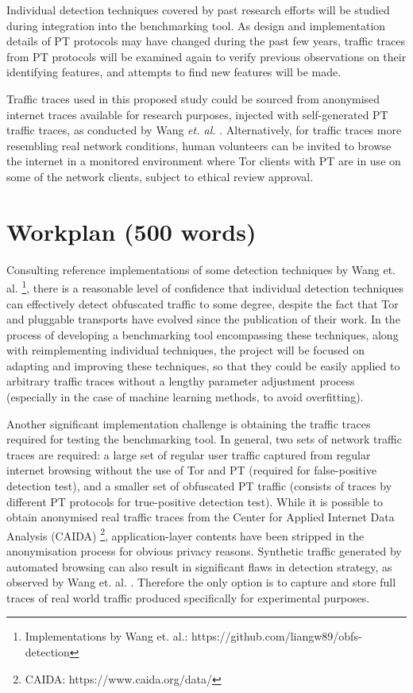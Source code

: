 \documentclass[11pt]{article}
\begin{document}
Individual detection techniques covered by past research efforts will be studied during integration into the benchmarking tool. As design and implementation details of PT protocols may have changed during the past few years, traffic traces from PT protocols will be examined again to verify previous observations on their identifying features, and attempts to find new features will be made.

Traffic traces used in this proposed study could be sourced from anonymised internet traces available for research purposes, injected with self-generated PT traffic traces, as conducted by Wang \emph{et. al.} \cite[Sec. 3]{wang2015seeing}. Alternatively, for traffic traces more resembling real network conditions, human volunteers can be invited to browse the internet in a monitored environment where Tor clients with PT are in use on some of the network clients, subject to ethical review approval.


\section{Workplan (500 words)}

Consulting reference implementations of some detection techniques by Wang et. al. \cite{wang2015seeing} \footnote{Implementations by Wang et. al.: https://github.com/liangw89/obfs-detection}, there is a reasonable level of confidence that individual detection techniques can effectively detect obfuscated traffic to some degree, despite the fact that Tor and pluggable transports have evolved since the publication of their work. In the process of developing a benchmarking tool encompassing these techniques, along with reimplementing individual techniques, the project will be focused on adapting and improving these techniques, so that they could be easily applied to arbitrary traffic traces without a lengthy parameter adjustment process (especially in the case of machine learning methods, to avoid overfitting). 

Another significant implementation challenge is obtaining the traffic traces required for testing the benchmarking tool. In general, two sets of network traffic traces are required: a large set of regular user traffic captured from regular internet browsing without the use of Tor and PT (required for false-positive detection test), and a smaller set of obfuscated PT traffic (consists of traces by different PT protocols for true-positive detection test). While it is possible to obtain anonymised real traffic traces from the Center for Applied Internet Data Analysis (CAIDA) \footnote{CAIDA: https://www.caida.org/data/}, application-layer contents have been stripped in the anonymisation process for obvious privacy reasons. Synthetic traffic generated by automated browsing can also result in significant flaws in detection strategy, as observed by Wang et. al. \cite[Sec. 6.1]{wang2015seeing}. Therefore the only option is to capture and store full traces of real world traffic produced specifically for experimental purposes.
\end{document}

